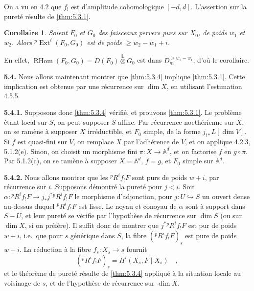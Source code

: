 \documentclass[12pt,a4paper]{article}
\theoremstyle{plain}
\newtheorem{corollary}[theorem]{Corollaire}
\theoremstyle{definition}
\DeclareMathOperator{\RHom}{RHom}
\DeclareMathOperator{\Ext}{Ext}
\newcommand{\into}{\hookrightarrow}
\providecommand{\Ext}{\operatorname{Ext}}
\providecommand{\RHom}{\operatorname{RHom}}
\begin{document}
On a vu en 4.2 que $f_{!}$ est d'amplitude cohomologique $[-d,d]$. L'assertion sur la puret\'{e} r\'{e}sulte de \ref{thm:5.3.1}.

\begin{corollary}\label{cor:5.3.10}
Soient $F_{0}$ et $G_{0}$ des faisceaux pervers purs sur $X_{0}$, de poids $w_{1}$ et $w_{2}$. Alors ${}^{p}\Ext^{i}(F_{0},G_{0})$ est de poids $\geq w_{2}-w_{1}+i$.
\end{corollary}

En effet, $\RHom(F_{0},G_{0}) = D(F_{0}) \overset{\mathbb{L}}{\otimes} G_{0}$ est dans $D_{m}^{\geq w_{2}-w_{1}}$, d'o\`{u} le corollaire.

\noindent\textbf{5.4.} Nous allons maintenant montrer que \ref{thm:5.3.4} implique \ref{thm:5.3.1}. Cette implication est obtenue par une r\'{e}currence sur $\dim X$, en utilisant l'estimation 4.5.5.

\noindent\textbf{5.4.1.} Supposons donc \ref{thm:5.3.4} v\'{e}rifi\'{e}, et prouvons \ref{thm:5.3.1}. Le probl\`{e}me \'{e}tant local sur $S$, on peut supposer $S$ affine. Par r\'{e}currence noeth\'{e}rienne sur $X$, on se ram\`{e}ne \`{a} supposer $X$ irr\'{e}ductible, et $F_{0}$ simple, de la forme $j_{!*}L[\dim V]$. Si $f$ est quasi-fini sur $V$, on remplace $X$ par l'adh\'{e}rence de $V$, et on applique 4.2.3, 5.1.2(e). Sinon, on choisit un morphisme fini $\pi: X \to \mathbb{A}^{d}$, et on factorise $f$ en $g \circ \pi$. Par 5.1.2(c), on se ram\`{e}ne \`{a} supposer $X = \mathbb{A}^{d}$, $f = g$, et $F_{0}$ simple sur $\mathbb{A}^{d}$.

\noindent\textbf{5.4.2.} Nous allons montrer que les ${}^{p}R^{i}f_{!}F$ sont purs de poids $w+i$, par r\'{e}currence sur $i$. Supposons d\'{e}montr\'{e} la puret\'{e} pour $j < i$. Soit $\alpha: {}^{p}R^{i}f_{!}F \to j_{*}j^{*}{}^{p}R^{i}f_{!}F$ le morphisme d'adjonction, pour $j: U \into S$ un ouvert dense au-dessus duquel ${}^{p}R^{i}f_{!}F$ est lisse. Le noyau et conoyau de $\alpha$ sont \`{a} support dans $S-U$, et leur puret\'{e} se v\'{e}rifie par l'hypoth\`{e}se de r\'{e}currence sur $\dim S$ (ou sur $\dim X$, si on pr\'{e}f\`{e}re). Il suffit donc de montrer que $j^{*}{}^{p}R^{i}f_{!}F$ est pur de poids $w+i$, i.e.\ que pour $s$ g\'{e}n\'{e}rique dans $S$, la fibre $({}^{p}R^{i}f_{!}F)_{s}$ est pure de poids $w+i$. La r\'{e}duction \`{a} la fibre $f_{s}: X_{s} \to s$ fournit
\[
({}^{p}R^{i}f_{!}F)_{s} = H^{i}(X_{s}, F \mid X_{s})\quad,
\]
et le th\'{e}or\`{e}me de puret\'{e} r\'{e}sulte de \ref{thm:5.3.4} appliqu\'{e} \`{a} la situation locale au voisinage de $s$, et de l'hypoth\`{e}se de r\'{e}currence sur $\dim X$.
\end{document}
